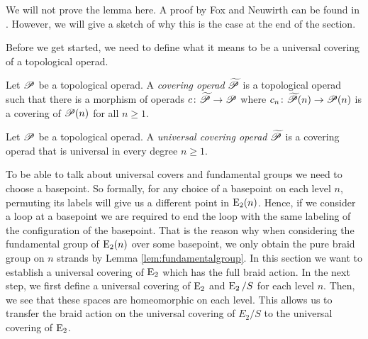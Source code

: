 We will not prove the
lemma here. A proof by Fox and Neuwirth can be found in \cite{fox}. However, we
will give a sketch of why this is the case at the end of the section.

Before we get started, we need to define what it means to be a universal
covering of a topological operad.

\begin{defin}
    Let $\P$  be a topological operad. A \emph{covering operad} $\widetilde{\P}$ is a
    topological operad such that there is a morphism of operads $c \colon
    \widetilde{\P} \to \P$ where $c_n \colon \widetilde{\P}(n) \to \P(n)$ is a
    covering of $\P(n)$ for all $n \geq 1$.
\end{defin}

\begin{defin}
    Let $\P$ be a topological operad. A \emph{universal covering operad}
    $\widetilde{\P}$ is a covering operad that is universal in every degree $n
    \geq 1$.
\end{defin}

To be able to talk about universal covers and fundamental groups
we need to choose a basepoint. So formally, for any choice of a basepoint on
each level $n$, permuting its labels will give us a different point in
$\E_2(n)$. Hence, if we consider a loop at a basepoint we are required to end
the loop with the same labeling of the configuration of the basepoint.
That is the reason why when considering the fundamental group of $\E_2(n)$ over some basepoint, we
only obtain the pure braid group on $n$ strands by Lemma
\ref{lem:fundamentalgroup}. 
In this section we want to establish a universal
covering of $\E_2$ which has the full braid action. 
In the next step, we first define a universal covering of $\E_2$ and $\E_2 \slash S$ for each level $n$.
Then, we see that these spaces are homeomorphic on each level. This allows us to transfer the braid action on
the universal covering of $E_2 \slash S$ to the universal covering of
$\E_2$.

